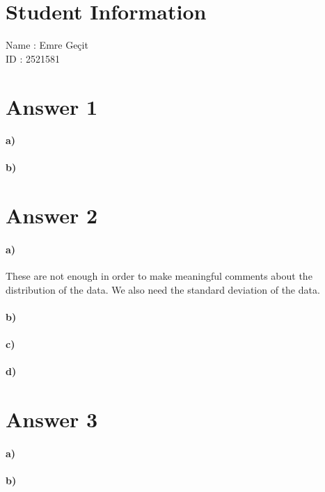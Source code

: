 \documentclass[12pt]{article}
\begin{document}
\section*{Student Information}

Name : Emre Geçit\\

ID : 2521581\\


\section*{Answer 1}
\paragraph{a)}
\paragraph{b)}

\section*{Answer 2}
\paragraph{a)}
These are not enough in order to make meaningful comments about the distribution of the data. We also need the standard deviation of the data.
\paragraph{b)}
\paragraph{c)}
\paragraph{d)}

\section*{Answer 3}
\paragraph{a)}
\paragraph{b)}
\end{document}
